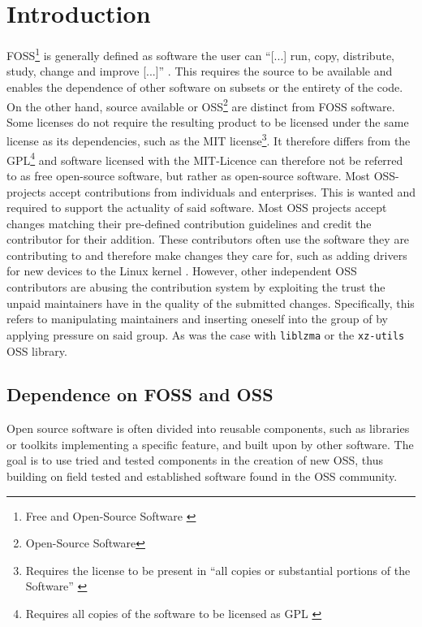 \section{Introduction}

FOSS\footnote{Free and Open-Source Software \cite{stallmann2021copyleft}} is
generally defined as software the user can ``[...] run, copy, distribute,
study, change and improve [...]'' \cite{fsf2024whycopylef}. This requires the
source to be available and enables the dependence of other software on subsets
or the entirety of the code. On the other hand, source available or
OSS\footnote{Open-Source Software} are distinct from FOSS software. Some
licenses do not require the resulting product to be licensed under the same
license as its dependencies, such as the MIT license\footnote{Requires the
license to be present in ``all copies or substantial portions of the Software''
\cite{osorg2024mit}}. It therefore differs from the GPL\footnote{Requires all
copies of the software to be licensed as GPL \cite{osorg2024gpl}} and software
licensed with the MIT-Licence can therefore not be referred to as free
open-source software, but rather as open-source software. \newline Most
OSS-projects accept contributions from individuals and enterprises. This is
wanted and required to support the actuality of said software. Most OSS
projects accept changes matching their pre-defined contribution guidelines and
credit the contributor for their addition. These contributors often use the
software they are contributing to and therefore make changes they care for,
such as adding drivers for new devices to the Linux kernel
\cite{linuxUnknownDevicedrivers}. \newline However, other independent OSS
contributors are abusing the contribution system by exploiting the trust the
unpaid maintainers have in the quality of the submitted changes. Specifically,
this refers to manipulating maintainers and inserting oneself into the
group of by applying pressure on said group. As was the case with
\texttt{liblzma} or the \texttt{xz-utils} OSS library.

\subsection{Dependence on FOSS and OSS}

Open source software is often divided into reusable components, such as
libraries or toolkits implementing a specific feature, and built upon by other
software. The goal is to use tried and tested components in the creation of new
OSS, thus building on field tested and established software found in the OSS
community.

